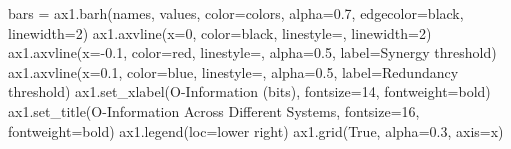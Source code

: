 \documentclass[
  11pt,
  letterpaper,
  oneside,
  openany]{book}
\newenvironment{Shaded}{\begin{snugshade}}{\end{snugshade}}
\newcommand{\DecValTok}[1]{\textcolor[rgb]{0.68,0.00,0.00}{#1}}
\newcommand{\FloatTok}[1]{\textcolor[rgb]{0.68,0.00,0.00}{#1}}
\newcommand{\NormalTok}[1]{\textcolor[rgb]{0.00,0.23,0.31}{#1}}
\newcommand{\OperatorTok}[1]{\textcolor[rgb]{0.37,0.37,0.37}{#1}}
\newcommand{\StringTok}[1]{\textcolor[rgb]{0.13,0.47,0.30}{#1}}
\newcommand{\VariableTok}[1]{\textcolor[rgb]{0.07,0.07,0.07}{#1}}
\begin{document}
\begin{Shaded}
\begin{Highlighting}[]
\NormalTok{bars }\OperatorTok{=}\NormalTok{ ax1.barh(names, values, color}\OperatorTok{=}\NormalTok{colors, alpha}\OperatorTok{=}\FloatTok{0.7}\NormalTok{, edgecolor}\OperatorTok{=}\StringTok{\textquotesingle{}black\textquotesingle{}}\NormalTok{, linewidth}\OperatorTok{=}\DecValTok{2}\NormalTok{)}
\NormalTok{ax1.axvline(x}\OperatorTok{=}\DecValTok{0}\NormalTok{, color}\OperatorTok{=}\StringTok{\textquotesingle{}black\textquotesingle{}}\NormalTok{, linestyle}\OperatorTok{=}\StringTok{\textquotesingle{}{-}\textquotesingle{}}\NormalTok{, linewidth}\OperatorTok{=}\DecValTok{2}\NormalTok{)}
\NormalTok{ax1.axvline(x}\OperatorTok{={-}}\FloatTok{0.1}\NormalTok{, color}\OperatorTok{=}\StringTok{\textquotesingle{}red\textquotesingle{}}\NormalTok{, linestyle}\OperatorTok{=}\StringTok{\textquotesingle{}{-}{-}\textquotesingle{}}\NormalTok{, alpha}\OperatorTok{=}\FloatTok{0.5}\NormalTok{, label}\OperatorTok{=}\StringTok{\textquotesingle{}Synergy threshold\textquotesingle{}}\NormalTok{)}
\NormalTok{ax1.axvline(x}\OperatorTok{=}\FloatTok{0.1}\NormalTok{, color}\OperatorTok{=}\StringTok{\textquotesingle{}blue\textquotesingle{}}\NormalTok{, linestyle}\OperatorTok{=}\StringTok{\textquotesingle{}{-}{-}\textquotesingle{}}\NormalTok{, alpha}\OperatorTok{=}\FloatTok{0.5}\NormalTok{, label}\OperatorTok{=}\StringTok{\textquotesingle{}Redundancy threshold\textquotesingle{}}\NormalTok{)}
\NormalTok{ax1.set\_xlabel(}\StringTok{\textquotesingle{}O{-}Information (bits)\textquotesingle{}}\NormalTok{, fontsize}\OperatorTok{=}\DecValTok{14}\NormalTok{, fontweight}\OperatorTok{=}\StringTok{\textquotesingle{}bold\textquotesingle{}}\NormalTok{)}
\NormalTok{ax1.set\_title(}\StringTok{\textquotesingle{}O{-}Information Across Different Systems\textquotesingle{}}\NormalTok{, fontsize}\OperatorTok{=}\DecValTok{16}\NormalTok{, fontweight}\OperatorTok{=}\StringTok{\textquotesingle{}bold\textquotesingle{}}\NormalTok{)}
\NormalTok{ax1.legend(loc}\OperatorTok{=}\StringTok{\textquotesingle{}lower right\textquotesingle{}}\NormalTok{)}
\NormalTok{ax1.grid(}\VariableTok{True}\NormalTok{, alpha}\OperatorTok{=}\FloatTok{0.3}\NormalTok{, axis}\OperatorTok{=}\StringTok{\textquotesingle{}x\textquotesingle{}}\NormalTok{)}


\end{Highlighting}
\end{Shaded}
\end{document}
